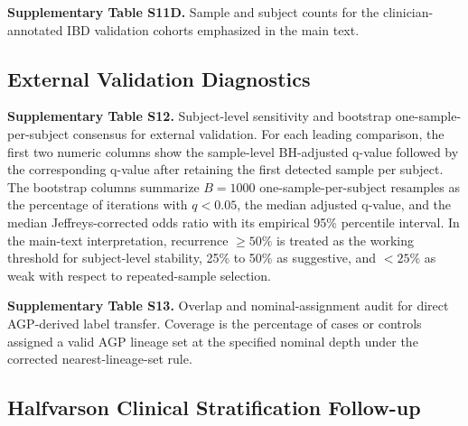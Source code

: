 \documentclass[11pt]{article}
\begin{document}


\medskip

\noindent\textbf{Supplementary Table S11D.} Sample and subject counts for
the clinician-annotated IBD validation cohorts emphasized in the main
text.



\subsection*{External Validation Diagnostics}

\noindent\textbf{Supplementary Table S12.} Subject-level sensitivity and
bootstrap one-sample-per-subject consensus for external validation.
For each leading comparison, the first two numeric columns show the
sample-level BH-adjusted q-value followed by the corresponding q-value
after retaining the first detected sample per subject. The bootstrap
columns summarize \(B = 1000\) one-sample-per-subject resamples as the
percentage of iterations with \(q < 0.05\), the median adjusted
q-value, and the median Jeffreys-corrected odds ratio with its empirical
95\% percentile interval. In the main-text interpretation, recurrence
\(\geq 50\%\) is treated as the working threshold for subject-level
stability, 25\% to 50\% as suggestive, and \(< 25\%\) as weak with
respect to repeated-sample selection.



\bigskip

\noindent\textbf{Supplementary Table S13.} Overlap and nominal-assignment
audit for direct AGP-derived label transfer. Coverage is the percentage
of cases or controls assigned a valid AGP lineage set at the specified
nominal depth under the corrected nearest-lineage-set rule.



\bigskip

\subsection*{Halfvarson Clinical Stratification Follow-up}




\end{document}
